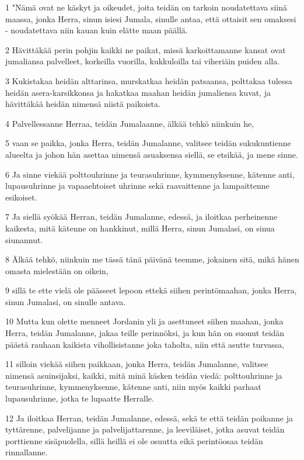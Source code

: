 \par 1 "Nämä ovat ne käskyt ja oikeudet, joita teidän on tarkoin noudatettava siinä maassa, jonka Herra, sinun isiesi Jumala, sinulle antaa, että ottaisit sen omaksesi - noudatettava niin kauan kuin elätte maan päällä.
\par 2 Hävittäkää perin pohjin kaikki ne paikat, missä karkoittamanne kansat ovat jumaliansa palvelleet, korkeilla vuorilla, kukkuloilla tai viheriäin puiden alla.
\par 3 Kukistakaa heidän alttarinsa, murskatkaa heidän patsaansa, polttakaa tulessa heidän asera-karsikkonsa ja hakatkaa maahan heidän jumaliensa kuvat, ja hävittäkää heidän nimensä niistä paikoista.
\par 4 Palvellessanne Herraa, teidän Jumalaanne, älkää tehkö niinkuin he,
\par 5 vaan se paikka, jonka Herra, teidän Jumalanne, valitsee teidän sukukuntienne alueelta ja johon hän asettaa nimensä asuaksensa siellä, se etsikää, ja mene sinne.
\par 6 Ja sinne viekää polttouhrinne ja teurasuhrinne, kymmenyksenne, kätenne anti, lupausuhrinne ja vapaaehtoiset uhrinne sekä raavaittenne ja lampaittenne esikoiset.
\par 7 Ja siellä syökää Herran, teidän Jumalanne, edessä, ja iloitkaa perheinenne kaikesta, mitä kätenne on hankkinut, millä Herra, sinun Jumalasi, on sinua siunannut.
\par 8 Älkää tehkö, niinkuin me tässä tänä päivänä teemme, jokainen sitä, mikä hänen omasta mielestään on oikein,
\par 9 sillä te ette vielä ole päässeet lepoon ettekä siihen perintömaahan, jonka Herra, sinun Jumalasi, on sinulle antava.
\par 10 Mutta kun olette menneet Jordanin yli ja asettuneet siihen maahan, jonka Herra, teidän Jumalanne, jakaa teille perinnöksi, ja kun hän on suonut teidän päästä rauhaan kaikista vihollisistanne joka taholta, niin että asutte turvassa,
\par 11 silloin viekää siihen paikkaan, jonka Herra, teidän Jumalanne, valitsee nimensä asuinsijaksi, kaikki, mitä minä käsken teidän viedä: polttouhrinne ja teurasuhrinne, kymmenyksenne, kätenne anti, niin myös kaikki parhaat lupausuhrinne, jotka te lupaatte Herralle.
\par 12 Ja iloitkaa Herran, teidän Jumalanne, edessä, sekä te että teidän poikanne ja tyttärenne, palvelijanne ja palvelijattarenne, ja leeviläiset, jotka asuvat teidän porttienne sisäpuolella, sillä heillä ei ole osuutta eikä perintöosaa teidän rinnallanne.

